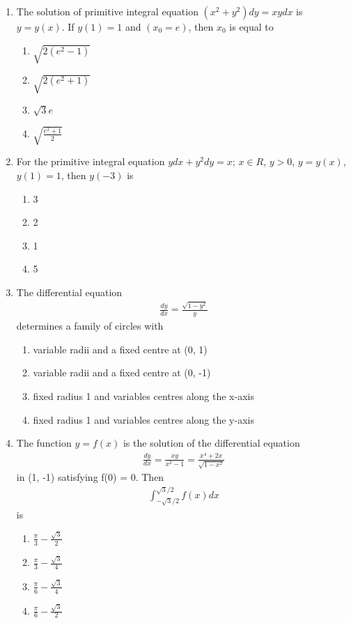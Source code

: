 \begin{enumerate}[label=\arabic*.,ref=\thesubsection.\theenumi]
\item The solution of primitive integral equation $(x^2 + y^2)dy = xydx$ is $y = y(x)$. If $y(1) = 1$ and $(x_0 = e)$, then $x_0$ is equal to
\begin{enumerate}
\item $\sqrt{2(e^2 - 1)}$
\item $\sqrt{2(e^2 + 1)}$
\item $\sqrt{3}e$
\item $\sqrt{\frac{e^2 + 1}{2}}$
\end{enumerate}

\item For the primitive integral equation $ydx + y^2dy = x$; $x \in R$, $y > 0$, $y = y(x)$, $y(1) = 1$, then $y(-3)$ is
\begin{enumerate}
\item 3
\item 2
\item 1
\item 5
\end{enumerate}

\item The differential equation 
\begin{align*}
\frac{dy}{dx} = \frac{\sqrt{1 - y^2}}{y}
\end{align*}
determines a family of circles with
\begin{enumerate}
\item variable radii and a fixed centre at (0, 1)
\item variable radii and a fixed centre at (0, -1)
\item fixed radius 1 and variables centres along the x-axis
\item fixed radius 1 and variables centres along the y-axis
\end{enumerate}

\item The function $y = f(x)$ is the solution of the differential equation
\begin{align*}
\frac{dy}{dx} = \frac{xy}{x^2 - 1} = \frac{x^4 + 2x}{\sqrt{1 - x^2}}
\end{align*}
in (1, -1) satisfying f(0) = 0. Then 
\begin{align*}
\int_{-\sqrt{3}/2}^{\sqrt{3}/2}f(x)dx
\end{align*}
is
\begin{enumerate}
\item $\frac{\pi}{3} - \frac{\sqrt{3}}{2}$
\item $\frac{\pi}{3} - \frac{\sqrt{3}}{4}$
\item $\frac{\pi}{6} - \frac{\sqrt{3}}{4}$
\item $\frac{\pi}{6} - \frac{\sqrt{3}}{2}$ 
\end{enumerate}


\end{enumerate}
